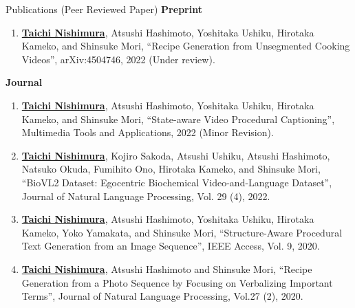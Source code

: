 \begin{rSection}{Publications (Peer Reviewed Paper)}
{\bf Preprint}
\vspace{-0.15cm}
\begin{enumerate}
    \item \underline{{\bf Taichi Nishimura}}, Atsushi Hashimoto, Yoshitaka Ushiku, Hirotaka Kameko, and Shinsuke Mori, ``Recipe Generation from Unsegmented Cooking Videos'', arXiv:4504746, 2022 (Under review).
\end{enumerate}

{\bf Journal}
\vspace{-0.15cm}
\begin{enumerate}
    \item \underline{{\bf Taichi Nishimura}}, Atsushi Hashimoto, Yoshitaka Ushiku, Hirotaka Kameko, and Shinsuke Mori, ``State-aware Video Procedural Captioning'', Multimedia Tools and Applications, 2022 (Minor Revision).
    \item \underline{{\bf Taichi Nishimura}}, Kojiro Sakoda, Atsushi Ushiku, Atsushi Hashimoto, Natsuko Okuda, Fumihito Ono, Hirotaka Kameko, and Shinsuke Mori, ``BioVL2 Dataset: Egocentric Biochemical Video-and-Language Dataset'', Journal of Natural Language Processing, Vol. 29 (4), 2022.
    \item \underline{{\bf Taichi Nishimura}}, Atsushi Hashimoto, Yoshitaka Ushiku, Hirotaka Kameko, Yoko Yamakata, and Shinsuke Mori, ``Structure-Aware Procedural Text Generation from an Image Sequence'', IEEE Access, Vol. 9, 2020.
    \item \underline{{\bf Taichi Nishimura}}, Atsushi Hashimoto and Shinsuke Mori, ``Recipe Generation from a Photo Sequence by Focusing on Verbalizing Important Terms'', Journal of Natural Language Processing, Vol.27 (2), 2020.
\end{enumerate}


\end{rSection}

